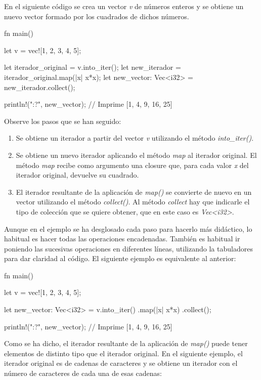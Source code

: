 En el siguiente código se crea un vector \textit{v} de números enteros y se obtiene un nuevo vector formado por los cuadrados de dichos números.

\vspace{0.7em}
\begin{Codigo}
   fn main() {
      let v = vec![1, 2, 3, 4, 5];
      
      let iterador_original = v.into_iter();
      let new_iterador = iterador_original.map(|x| x*x);
      let new_vector: Vec<i32> = new_iterador.collect();
      
      println!("{:?}", new_vector); // Imprime [1, 4, 9, 16, 25]
   }
\end{Codigo}

Observe los pasos que se han seguido:
\begin{enumerate}
   \item Se obtiene un iterador a partir del vector \textit{v} utilizando el método \textit{into\_iter()}.
   \item Se obtiene un nuevo iterador aplicando el método \textit{map} al iterador original. El método \textit{map} recibe como argumento una closure que, para cada valor \textit{x} del iterador original, devuelve su cuadrado.
   \item El iterador resultante de la aplicación de \textit{map()} se convierte de nuevo en un vector utilizando el método \textit{collect()}. Al método \textit{collect} hay que indicarle el tipo de colección que se quiere obtener, que en este caso es \textit{Vec<i32>}.
\end{enumerate}

Aunque en el ejemplo se ha desglosado cada paso para hacerlo más didáctico, lo habitual es hacer todas las operaciones encadenadas. También es habitual ir poniendo las sucesivas operaciones en diferentes líneas, utilizando la tabuladores para dar claridad al código. El siguiente ejemplo es equivalente al anterior:

\vspace{0.7em}
\begin{Codigo}
   fn main() {
      let v = vec![1, 2, 3, 4, 5];
      
      let new_vector: Vec<i32> = v.into_iter() 
      .map(|x| x*x)
      .collect();
      
      println!("{:?}", new_vector); // Imprime [1, 4, 9, 16, 25]
   }
\end{Codigo}

Como se ha dicho, el iterador resultante de la aplicación de \textit{map()} puede tener elementos de distinto tipo que el iterador original. En el siguiente ejemplo, el iterador original es de cadenas de caracteres y se obtiene un iterador con el número de caracteres de cada una de esas cadenas:

